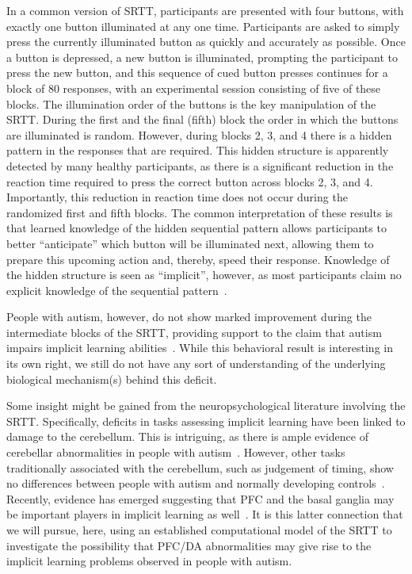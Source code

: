 \documentclass[man]{apa}
\begin{document}
In a common version of SRTT, participants are presented with four buttons, with exactly one button illuminated at any one time.  Participants are asked to simply press the currently illuminated button as quickly and accurately as possible.  Once a button is depressed, a new button is illuminated, prompting the participant to press the new button, and this sequence of cued button presses continues for a block of 80 responses, with an experimental session consisting of five of these blocks.  The illumination order of the buttons is the key manipulation of the SRTT.  During the first and the final (fifth) block the order in which the buttons are illuminated is random.  However, during blocks 2, 3, and 4 there is a hidden pattern in the responses that are required.  This hidden structure is apparently detected by many healthy participants, as there is a significant reduction in the reaction time required to press the correct button across blocks 2, 3, and 4.  Importantly, this reduction in reaction time does not occur during the randomized first and fifth blocks.  The common interpretation of these results is that learned knowledge of the hidden sequential pattern allows participants to better ``anticipate'' which button will be illuminated next, allowing them to prepare this upcoming action and, thereby, speed their response.  Knowledge of the hidden structure is seen as ``implicit'', however, as most participants claim no explicit knowledge of the sequential pattern~\cite{Cleeremans:1991:SSRT}.

People with autism, however, do not show marked improvement during the intermediate blocks of the SRTT, providing support to the claim that autism impairs implicit learning abilities~\cite{RefWorks:148}.  While this behavioral result is interesting in its own right, we still do not have any sort of understanding of the underlying biological mechanism(s) behind this deficit.

Some insight might be gained from the neuropsychological literature involving the SRTT.  Specifically, deficits in tasks assessing implicit learning have been linked to damage to the cerebellum.  This is intriguing, as there is ample evidence of cerebellar abnormalities in people with autism~\cite{CourchesneE:1994:CerebellumAttentionShift}.  However, other tasks traditionally associated with the cerebellum, such as judgement of timing, show no differences between people with autism and normally developing controls~\cite{RefWorks:148}.  Recently, evidence has emerged suggesting that PFC and the basal ganglia may be important players in implicit learning as well~\cite{RefWorks:109,PascualLeone:2004:PFC_Implicit}.  It is this latter connection that we will pursue, here, using an established computational model of the SRTT to investigate the possibility that PFC/DA abnormalities may give rise to the implicit learning problems observed in people with autism.
\end{document}
